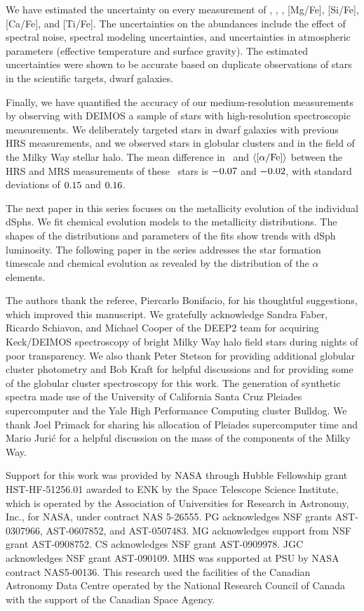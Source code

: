 \documentclass{emulateapj}
\begin{document}
We have estimated the uncertainty on every measurement of \teff,
\logg, \feh, [Mg/Fe], [Si/Fe], [Ca/Fe], and [Ti/Fe].  The
uncertainties on the abundances include the effect of spectral noise,
spectral modeling uncertainties, and uncertainties in atmospheric
parameters (effective temperature and surface gravity).  The estimated
uncertainties were shown to be accurate based on duplicate
observations of stars in the scientific targets, dwarf galaxies.

Finally, we have quantified the accuracy of our medium-resolution
measurements by observing with DEIMOS a sample of stars with
high-resolution spectroscopic measurements.  We deliberately targeted
stars in dwarf galaxies with previous HRS measurements, and we
observed stars in globular clusters and in the field of the Milky Way
stellar halo.  The mean difference in \feh\ and
$\langle[\alpha/\rm{Fe}]\rangle$ between the HRS and MRS measurements
of these \nhrs\ stars is $-0.07$ and $-0.02$,
with standard deviations of $0.15$ and
$0.16$.

The next paper in this series focuses on the metallicity evolution of
the individual dSphs.  We fit chemical evolution models to the
metallicity distributions.  The shapes of the distributions and
parameters of the fits show trends with dSph luminosity.  The
following paper in the series addresses the star formation timescale
and chemical evolution as revealed by the distribution of the $\alpha$
elements.

\acknowledgments

The authors thank the referee, Piercarlo Bonifacio, for his thoughtful
suggestions, which improved this manuscript.  We gratefully
acknowledge Sandra Faber, Ricardo Schiavon, and Michael Cooper of the
DEEP2 team for acquiring Keck/DEIMOS spectroscopy of bright Milky Way
halo field stars during nights of poor transparency.  We also thank
Peter Stetson for providing additional globular cluster photometry and
Bob Kraft for helpful discussions and for providing some of the
globular cluster spectroscopy for this work.  The generation of
synthetic spectra made use of the University of California Santa Cruz
Pleiades supercomputer and the Yale High Performance Computing cluster
Bulldog.  We thank Joel Primack for sharing his allocation of Pleiades
supercomputer time and Mario Juri{\'c} for a helpful discussion on the
mass of the components of the Milky Way.

Support for this work was provided by NASA through Hubble Fellowship
grant HST-HF-51256.01 awarded to ENK by the Space Telescope Science
Institute, which is operated by the Association of Universities for
Research in Astronomy, Inc., for NASA, under contract NAS 5-26555.  PG
acknowledges NSF grants AST-0307966, AST-0607852, and AST-0507483.  MG
acknowledges support from NSF grant AST-0908752.  CS acknowledges NSF
grant AST-0909978.  JGC acknowledges NSF grant AST-090109.  MHS was
supported at PSU by NASA contract NAS5-00136.  This research used the
facilities of the Canadian Astronomy Data Centre operated by the
National Research Council of Canada with the support of the Canadian
Space Agency.
\end{document}
